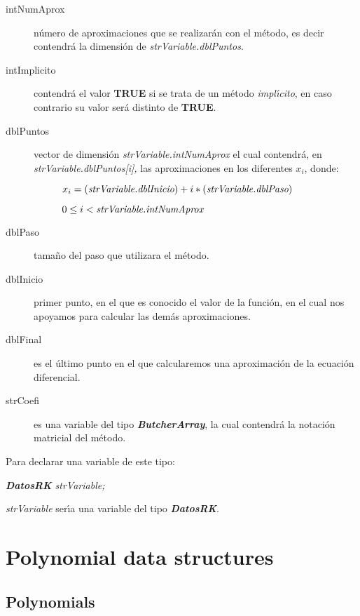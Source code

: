 \begin{description}
\item[intNumAprox] n\'umero de aproximaciones que se realizar\'an con el
m\'etodo, es decir contendr\'a la dimensi\'on de \emph{strVariable.dblPuntos}.
\item[intImplicito] contendr\'a el valor \textbf{TRUE} si se trata de un 
m\'etodo \emph{impl\'{\i}cito}, en caso contrario su valor ser\'a distinto de
\textbf{TRUE}.
\item[dblPuntos] vector de dimensi\'on \emph{strVariable.intNumAprox} el 
cual contendr\'a, en \emph{strVariable.dblPuntos[i],} 
las aproximaciones en los diferentes $x_i$, donde:

\begin{description}
\item[]$x_i = (\emph{strVariable.dblInicio}) + i * (\emph{strVariable.dblPaso})$
\item[]$0 \leq i < \emph{strVariable.intNumAprox}$
\end{description}

\item[dblPaso] tama\~no del paso que utilizara el m\'etodo.\newpage
\item[dblInicio] primer punto, en el que es conocido el valor de la funci\'on,
en el cual nos apoyamos para calcular las dem\'as aproximaciones.
\item[dblFinal] es el \'ultimo punto en el que calcularemos una aproximaci\'on
de la ecuaci\'on diferencial.
\item[strCoefi] es una variable del tipo \emph{\textbf{ButcherArray}}, la cual
contendr\'a la notaci\'on matricial del m\'etodo.
\end{description}

Para declarar una variable de este tipo:

\begin{center}
\emph{\textbf{DatosRK} strVariable;}
\end{center}

\emph{strVariable} ser\'{\i}a una variable del tipo \emph{\textbf{DatosRK}}.

\newpage

\section{Polynomial data structures}

\subsection{Polynomials}

